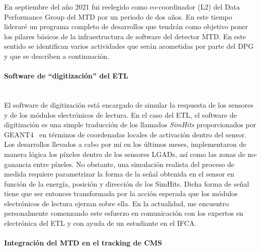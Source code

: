 En septiembre del año 2021 fui reelegido como co-coordinador (L2) del Data Performance Group del MTD por un periodo de dos años. En este tiempo lideraré un programa completo de desarrollos que tendrán como objetivo poner los pilares básicos de la infraestructura de software del detector MTD. En este sentido se identifican varios actividades que serán acometidas por parte del DPG y que se describen a continuación.

\paragraph{Software de ``digitización'' del ETL\\\\}

El software de digitización está encargado de simular la respuesta de los sensores y de los módulos electrónicos de lectura. En el caso del ETL, el software de digitización es una simple traducción de los llamados \emph{SimHits} proporcionados por GEANT4~\cite{geant4} en términos de coordenadas locales de activación dentro del sensor. Los desarrollos llevados a cabo por mí en los últimos meses, implementaron de manera lógica los píxeles dentro de los sensores LGADs, así como las zonas de no-ganancia entre píxeles. No obstante, una simulación realista del proceso de medida requiere parametrizar la forma de la señal obtenida en el sensor en función de la energía, posición y dirección de los SimHits. Dicha forma de señal tiene que ser entonces transformada por la acción esperada que los módulos electrónicos de lectura ejerzan sobre ella. En la actualidad, me encuentro personalmente comenzando este esfuerzo en comunicación con los expertos en electrónica del ETL y con ayuda de un estudiante en el IFCA.     

\paragraph{Integración del MTD en el tracking de CMS\\\\}


